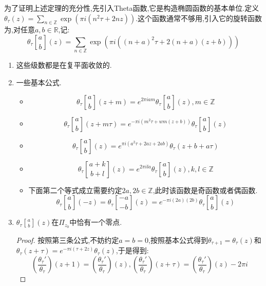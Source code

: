 为了证明上述定理的充分性,先引入Theta函数,它是构造椭圆函数的基本单位.定义$\theta_{\tau}(z)=\sum_{n\in\mathbb{Z}}\exp\left(\pi i(n^2\tau+2nz)\right)$.这个函数通常不够用,引入它的旋转函数为,对任意$a,b\in\mathbb{R}$,记:
$$\theta_{\tau}\genfrac{[}{]}{0pt}{}{a}{b}(z)=\sum_{n\in\mathbb{Z}}\exp\left(\pi i((n+a)^2\tau+2(n+a)(z+b))\right)$$
\begin{enumerate}
	\item 这些级数都是在复平面收敛的.
	\item 一些基本公式.
	\begin{itemize}
		\item $$\theta_{\tau}\genfrac{[}{]}{0pt}{}{a}{b}(z+m)=e^{2\pi iam}\theta_{\tau}\genfrac{[}{]}{0pt}{}{a}{b}(z),m\in\mathbb{Z}$$
		\item $$\theta_{\tau}\genfrac{[}{]}{0pt}{}{a}{b}(z+m\tau)=e^{-\pi i(m^2\tau+wm(z+b))}\theta_{\tau}\genfrac{[}{]}{0pt}{}{a}{b}(z)$$
		\item $$\theta_{\tau}\genfrac{[}{]}{0pt}{}{a}{b}(z)=e^{\pi i(a^2\tau+2az+2ab)}\theta_{\tau}(z+b+a\tau)$$
		\item $$\theta_{\tau}\genfrac{[}{]}{0pt}{}{a+k}{b+l}(z)=e^{2\pi ila}\theta_{\tau}\genfrac{[}{]}{0pt}{}{a}{b}(z),k,l\in\mathbb{Z}$$
		\item 下面第二个等式成立需要约定$2a,2b\in\mathbb{Z}$,此时该函数是奇函数或者偶函数. $$\theta_{\tau}\genfrac{[}{]}{0pt}{}{a}{b}(-z)=\theta_{\tau}\genfrac{[}{]}{0pt}{}{-a}{-b}(z)=e^{-\pi i(2a)(2b)}\theta_{\tau}\genfrac{[}{]}{0pt}{}{a}{b}(z)$$
	\end{itemize}
    \item $\theta_{\tau}\genfrac{[}{]}{0pt}{}{a}{b}(z)$在$\Pi_{z_0}$中恰有一个零点.
    \begin{proof}
    	
    	按照第三条公式,不妨约定$a=b=0$,按照基本公式得到$\theta_{\tau+1}=\theta_{\tau}(z)$和$\theta_{\tau}(z+\tau)=e^{-\pi i(\tau+2z)}\theta_{\tau}(z)$,于是得到:
    	$$\left(\frac{\theta_{\tau}'}{\theta_{\tau}}\right)(z+1)=\left(\frac{\theta_{\tau}'}{\theta_{\tau}}\right)(z),\left(\frac{\theta_{\tau}'}{\theta_{\tau}}\right)(z+\tau)=\left(\frac{\theta_{\tau}'}{\theta_{\tau}}\right)(z)-2\pi i$$
    	

\end{proof}
\end{enumerate}
